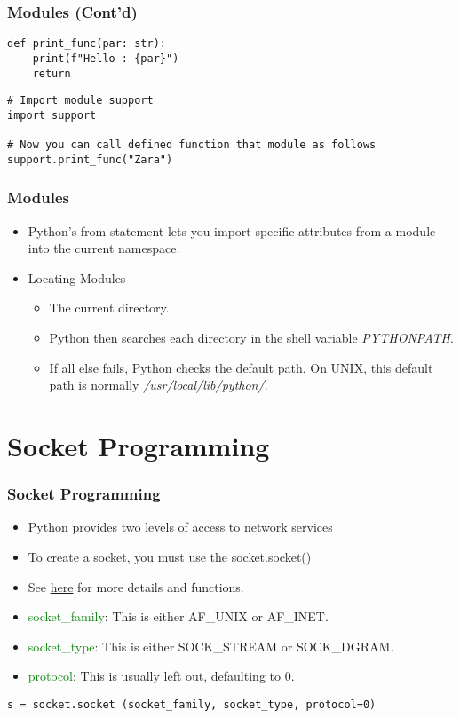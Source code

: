 \documentclass{../py-lecture}
\begin{document}
\begin{frame}[fragile]
	\frametitle{Modules (Cont'd)}
	\begin{verbatim}
def print_func(par: str):
    print(f"Hello : {par}")
    return
  \end{verbatim}
  \begin{verbatim}
# Import module support
import support

# Now you can call defined function that module as follows
support.print_func("Zara")
	\end{verbatim}
\end{frame}

\begin{frame}
	\frametitle{Modules}
  \begin{itemize}
    \item Python's from statement lets you import specific attributes from a
      module into the current namespace.
    \item Locating Modules
    \begin{itemize}
      \item The current directory.
      \item Python then searches each directory in the shell variable \textit{PYTHONPATH}.
      \item If all else fails, Python checks the default path.
        On UNIX, this default path is normally \textit{/usr/local/lib/python/}.
    \end{itemize}
  \end{itemize}
\end{frame}

\section{Socket Programming}

\begin{frame}[fragile]
	\frametitle{Socket Programming}
  \begin{itemize}
    \item Python provides two levels of access to network services
    \item To create a socket, you must use the socket.socket()
    \item See
    \textcolor{blue}{\href{https://docs.python.org/3/library/socket.html}{here}}
    for more details and functions.
    \item \textcolor{green}{socket\_family}: This is either AF\_UNIX or AF\_INET.
    \item \textcolor{green}{socket\_type}: This is either SOCK\_STREAM or SOCK\_DGRAM.
    \item \textcolor{green}{protocol}: This is usually left out, defaulting to 0.
  \end{itemize}
  \begin{verbatim}
s = socket.socket (socket_family, socket_type, protocol=0)
  \end{verbatim}
\end{frame}
\end{document}
